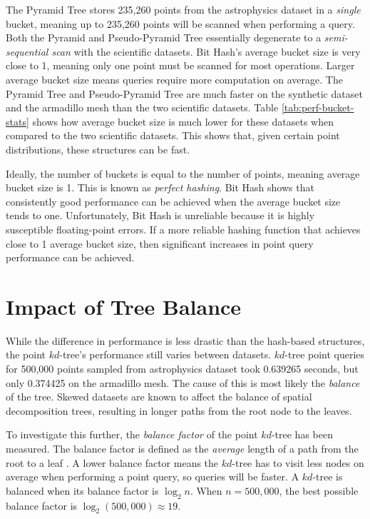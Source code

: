 The Pyramid Tree stores 235,260 points from the astrophysics dataset in a \textit{single} bucket, meaning up to 235,260 points will be scanned when performing a query. Both the Pyramid and Pseudo-Pyramid Tree essentially degenerate to a \textit{semi-sequential scan} with the scientific datasets. Bit Hash's average bucket size is very close to 1, meaning only one point must be scanned for most operations. Larger average bucket size means queries require more computation on average. The Pyramid Tree and Pseudo-Pyramid Tree are much faster on the synthetic dataset and the armadillo mesh than the two scientific datasets. Table \ref{tab:perf-bucket-stats} shows how average bucket size is much lower for these datasets when compared to the two scientific datasets. This shows that, given certain point distributions, these structures can be fast.

Ideally, the number of buckets is equal to the number of points, meaning average bucket size is 1. This is known as \textit{perfect hashing}. Bit Hash shows that consistently good performance can be achieved when the average bucket size tends to one. Unfortunately, Bit Hash is unreliable because it is highly susceptible floating-point errors. If a more reliable hashing function that achieves close to 1 average bucket size, then significant increases in point query performance can be achieved.

\section{Impact of Tree Balance}

While the difference in performance is less drastic than the hash-based structures, the point $kd$-tree's performance still varies between datasets. $kd$-tree point queries for 500,000 points sampled from astrophysics dataset took 0.639265 seconds, but only 0.374425 on the armadillo mesh. The cause of this is most likely the \textit{balance} of the tree. Skewed datasets are known to affect the balance of spatial decomposition trees, resulting in longer paths from the root node to the leaves.

To investigate this further, the \textit{balance factor} of the point $kd$-tree has been measured. The balance factor is defined as the \textit{average} length of a path from the root to a leaf \cite{kdtree-v-bdtree}. A lower balance factor means the $kd$-tree has to visit less nodes on average when performing a point query, so queries will be faster. A $kd$-tree is balanced when its balance factor is $\log_2 n$. When $n = 500,000$, the best possible balance factor is $\log_2 (500,000) \approx 19$.

